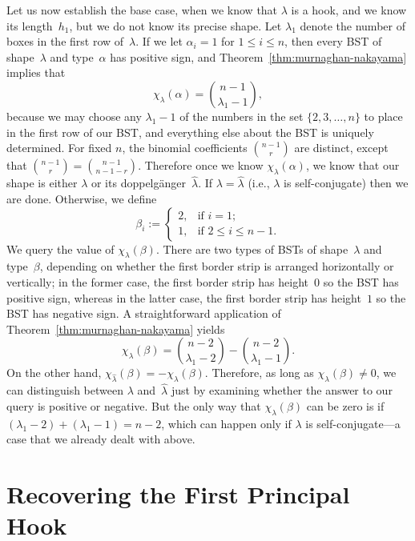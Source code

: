 \documentclass[12pt]{article}
\newcommand{\dop}{doppelg\"anger}
\theoremstyle{definition}
\begin{document}
Let us now establish the base case,
when we know that $\lambda$ is a hook, and we know its length~$h_1$,
but we do not know its precise shape.
Let $\lambda_1$ denote the number of boxes in the first row of~$\lambda$.
If we let $\alpha_i=1$ for $1\le i\le n$, then
every BST of shape~$\lambda$ and type~$\alpha$ has positive sign,
and Theorem~\ref{thm:murnaghan-nakayama} implies that
\begin{equation*}
\chi_\lambda(\alpha) = \binom{n-1}{\lambda_1-1},
\end{equation*}
because we may choose any $\lambda_1 - 1$ of the numbers
in the set $\{2,3,\ldots, n\}$ to place in the first row
of our BST, and everything else about the BST
is uniquely determined.
For fixed $n$, the binomial coefficients $\binom{n-1}{r}$ are distinct,
except that $\binom{n-1}{r} = \binom{n-1}{n-1-r}$.
Therefore once we know $\chi_\lambda(\alpha)$,
we know that our shape is either $\lambda$ or its \dop~$\hat\lambda$.
If $\lambda=\hat\lambda$ (i.e., $\lambda$ is self-conjugate)
then we are done.
Otherwise, we define
\begin{equation*}
\beta_i :=
\begin{cases}
2, &\mbox{if $i=1$;}\\
1, &\mbox{if $2\le i \le n-1$.}
\end{cases}
\end{equation*}
We query the value of $\chi_\lambda(\beta)$.
There are two types of BSTs of shape~$\lambda$
and type~$\beta$, depending on whether the first border strip
is arranged horizontally or vertically;
in the former case, the first border strip has height~$0$
so the BST has positive sign,
whereas in the latter case, the first border strip has height~$1$
so the BST has negative sign.
A straightforward application of
Theorem~\ref{thm:murnaghan-nakayama} yields
\begin{equation*}
\chi_\lambda(\beta) = \binom{n-2}{\lambda_1-2} - \binom{n-2}{\lambda_1 - 1}.
\end{equation*}
On the other hand, $\chi_{\hat\lambda}(\beta) = - \chi_{\lambda}(\beta)$.
Therefore, as long as $\chi_\lambda(\beta)\ne 0$,
we can distinguish between $\lambda$ and~$\hat\lambda$
just by examining whether the answer to our query is positive or negative.
But the only way that $\chi_\lambda(\beta)$ can be zero is if
$(\lambda_1 - 2) + (\lambda_1 - 1) = n-2$, which can happen only if $\lambda$
is self-conjugate---a case that we already dealt with above.

\section{Recovering the First Principal Hook}
\label{sec:firsthook}
\end{document}
